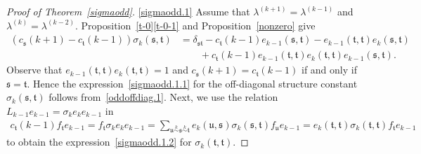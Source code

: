 \documentclass[11pt,a4paper,reqno,svgnames]{amsart}
\theoremstyle{plain}
\theoremstyle{definition}
\numberwithin{equation}{section}
\begin{document}
\begin{proof}[Proof of Theorem~\ref{sigmaodd}] 
\eqref{sigmaodd.1} Assume that  $\lambda^{(k+1)}=\lambda^{(k-1)}$ and $\lambda^{(k)}=\lambda^{(k-2)}$. Proposition~\ref{t-0}\eqref{t-0-1} and Proposition~\ref{nonzero} give
\begin{equation}\label{oddoffdiag.1}
\begin{split}
(c_\mathfrak{s}(k+1)-c_\mathfrak{t}(k-1))\sigma_k(\mathfrak{s,t})&= \delta_\mathfrak{st}-c_\mathfrak{t}(k-1)e_{k-1}(\mathfrak{s,t})-e_{k-1}(\mathfrak{t,t})e_k(\mathfrak{s,t})\\ &\qquad +c_\mathfrak{t}(k-1)e_{k-1}(\mathfrak{t,t}) e_k(\mathfrak{t,t})e_{k-1}(\mathfrak{s,t}).
\end{split}
\end{equation}
Observe that $e_{k-1}(\mathfrak{t,t}) e_k(\mathfrak{t,t})=1$ and $c_\mathfrak{s}(k+1)=c_\mathfrak{t}(k-1)$ if and only if $\mathfrak{s}=\mathfrak{t}$. Hence the expression~\eqref{sigmaodd.1.1} for the off-diagonal structure constant $\sigma_k(\mathfrak{s,t})$ follows from~\eqref{oddoffdiag.1}. Next, we use the relation $L_{k-1}e_{k-1}=\sigma_ke_ke_{k-1}$ in 
\begin{align*}
c_\mathfrak{t}(k-1)f_\mathfrak{t}e_{k-1}=f_\mathfrak{t}\sigma_ke_ke_{k-1}= \sum_{\mathfrak{u}\stackrel{k}{\sim}\mathfrak{s}\stackrel{k}{\sim}\mathfrak{t}}e_k(\mathfrak{u,s})\sigma_{k}(\mathfrak{s,t})f_\mathfrak{u}e_{k-1}=e_k(\mathfrak{t,t})\sigma_k(\mathfrak{t,t})f_\mathfrak{t}e_{k-1}
\end{align*}
to obtain the expression~\eqref{sigmaodd.1.2} for $\sigma_k(\mathfrak{t,t})$. 


\end{proof}
\end{document}
